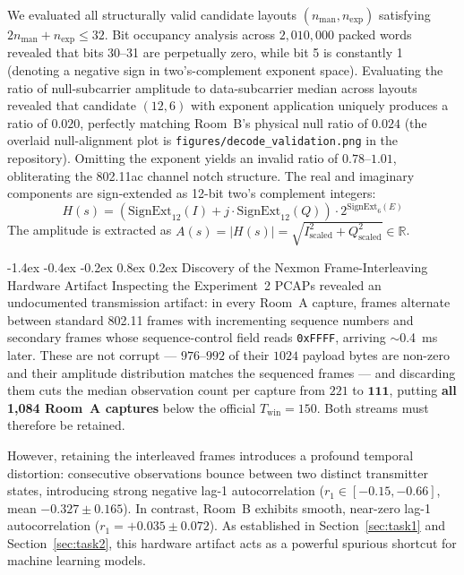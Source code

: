 \documentclass[10pt,a4paper]{article}
\makeatletter
\renewcommand{\subsection}{\@startsection{subsection}{2}{\z@}%
  {-1.4ex \@plus -0.4ex \@minus -0.2ex}%
  {0.8ex \@plus 0.2ex}%
  {\normalfont\normalsize\bfseries\color{secondary}}}
\makeatother
\begin{document}
We evaluated all structurally valid candidate layouts $(n_{\text{man}}, n_{\text{exp}})$ satisfying $2n_{\text{man}} + n_{\text{exp}} \le 32$. Bit occupancy analysis across $2,010,000$ packed words revealed that bits 30--31 are perpetually zero, while bit 5 is constantly 1 (denoting a negative sign in two's-complement exponent space). Evaluating the ratio of null-subcarrier amplitude to data-subcarrier median across layouts revealed that candidate $(12, 6)$ with exponent application uniquely produces a ratio of $\mathbf{0.020}$, perfectly matching Room~B's physical null ratio of $\mathbf{0.024}$ (the overlaid null-alignment plot is \texttt{figures/decode\_validation.png} in the repository). Omitting the exponent yields an invalid ratio of $0.78$--$1.01$, obliterating the 802.11ac channel notch structure. The real and imaginary components are sign-extended as 12-bit two's complement integers:
\begin{equation}
    H(s) = \left( \text{SignExt}_{12}(I) + j \cdot \text{SignExt}_{12}(Q) \right) \cdot 2^{\text{SignExt}_6(E)}
\end{equation}
The amplitude is extracted as $A(s) = |H(s)| = \sqrt{I_{\text{scaled}}^2 + Q_{\text{scaled}}^2} \in \mathbb{R}$.


\subsection{Discovery of the Nexmon Frame-Interleaving Hardware Artifact}
Inspecting the Experiment~2 PCAPs revealed an undocumented transmission artifact: in every Room~A capture, frames alternate between standard 802.11 frames with incrementing sequence numbers and secondary frames whose sequence-control field reads \texttt{0xFFFF}, arriving $\sim$0.4~ms later. These are not corrupt --- $976$--$992$ of their $1024$ payload bytes are non-zero and their amplitude distribution matches the sequenced frames --- and discarding them cuts the median observation count per capture from $221$ to $\mathbf{111}$, putting \textbf{all 1,084 Room~A captures} below the official $T_{\text{win}}=150$. Both streams must therefore be retained.

However, retaining the interleaved frames introduces a profound temporal distortion: consecutive observations bounce between two distinct transmitter states, introducing strong negative lag-1 autocorrelation ($r_1 \in [-0.15, -0.66]$, mean $-0.327 \pm 0.165$). In contrast, Room~B exhibits smooth, near-zero lag-1 autocorrelation ($r_1 = +0.035 \pm 0.072$). As established in Section~\ref{sec:task1} and Section~\ref{sec:task2}, this hardware artifact acts as a powerful spurious shortcut for machine learning models.
\end{document}
